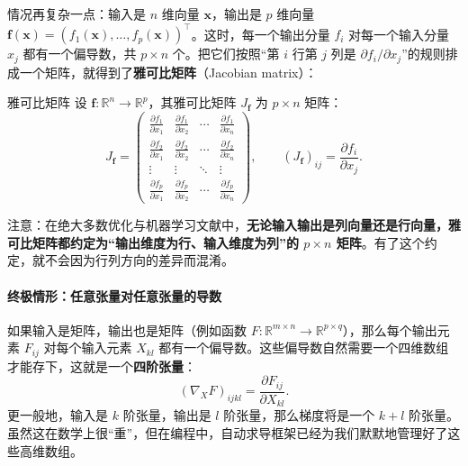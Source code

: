 情况再复杂一点：输入是 $n$ 维向量 $\mathbf{x}$，输出是 $p$ 维向量 $\mathbf{f}(\mathbf{x}) = (f_1(\mathbf{x}), \dots, f_p(\mathbf{x}))^\top$。这时，每一个输出分量 $f_i$ 对每一个输入分量 $x_j$ 都有一个偏导数，共 $p \times n$ 个。把它们按照“第 $i$ 行第 $j$ 列是 $\partial f_i / \partial x_j$”的规则排成一个矩阵，就得到了\textbf{雅可比矩阵}（Jacobian matrix）：
\begin{definition}{雅可比矩阵}{}
    设 $\mathbf{f}: \mathbb{R}^n \to \mathbb{R}^p$，其雅可比矩阵 $J_{\mathbf{f}}$ 为 $p \times n$ 矩阵：
    \begin{equation}
        J_{\mathbf{f}} =
        \begin{pmatrix}
            \frac{\partial f_1}{\partial x_1} & \frac{\partial f_1}{\partial x_2} & \cdots & \frac{\partial f_1}{\partial x_n} \\[4pt]
            \frac{\partial f_2}{\partial x_1} & \frac{\partial f_2}{\partial x_2} & \cdots & \frac{\partial f_2}{\partial x_n} \\
            \vdots & \vdots & \ddots & \vdots \\
            \frac{\partial f_p}{\partial x_1} & \frac{\partial f_p}{\partial x_2} & \cdots & \frac{\partial f_p}{\partial x_n}
        \end{pmatrix}, \qquad (J_{\mathbf{f}})_{ij} = \frac{\partial f_i}{\partial x_j}.
    \end{equation}
\end{definition}

注意：在绝大多数优化与机器学习文献中，\textbf{无论输入输出是列向量还是行向量，雅可比矩阵都约定为“输出维度为行、输入维度为列”的 $p\times n$ 矩阵}。有了这个约定，就不会因为行列方向的差异而混淆。

\paragraph{终极情形：任意张量对任意张量的导数}

如果输入是矩阵，输出也是矩阵（例如函数 $F: \mathbb{R}^{m \times n} \to \mathbb{R}^{p \times q}$），那么每个输出元素 $F_{ij}$ 对每个输入元素 $X_{kl}$ 都有一个偏导数。这些偏导数自然需要一个四维数组才能存下，这就是一个\textbf{四阶张量}：
\[
    (\nabla_X F)_{ijkl} = \frac{\partial F_{ij}}{\partial X_{kl}} .
\]
更一般地，输入是 $k$ 阶张量，输出是 $l$ 阶张量，那么梯度将是一个 $k+l$ 阶张量。虽然这在数学上很“重”，但在编程中，自动求导框架已经为我们默默地管理好了这些高维数组。

